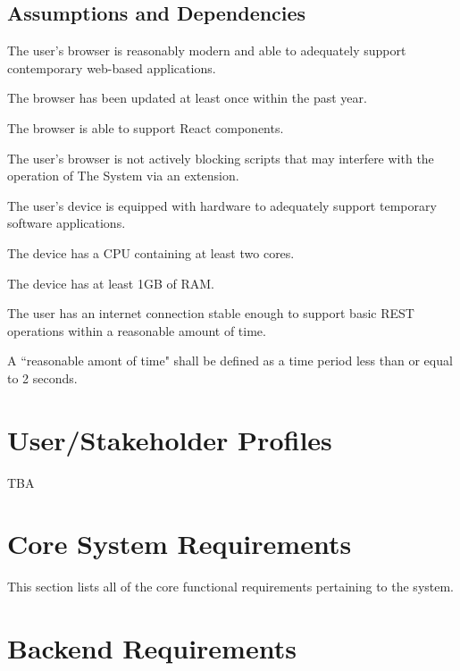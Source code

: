 \documentclass[12pt]{report}
\begin{document}
	\subsection{Assumptions and Dependencies}
		\begin{reqlist}
			\item The user's browser is reasonably modern and able to adequately support contemporary web-based applications.
			\begin{reqlist}
				\item The browser has been updated at least once within the past year.
				\item The browser is able to support React components.
			\end{reqlist}
			\item The user's browser is not actively blocking scripts that may interfere with the operation of The System via an extension.
			\item The user's device is equipped with hardware to adequately support temporary software applications.
			\begin{reqlist}
				\item The device has a CPU containing at least two cores.
				\item The device has at least 1GB of RAM.
			\end{reqlist}
			\item The user has an internet connection stable enough to support basic REST operations within a reasonable amount of time.
			\begin{reqlist}
				\item A ``reasonable amont of time" shall be defined as a time period less than or equal to 2 seconds.
			\end{reqlist}
		\end{reqlist}

\section{User/Stakeholder Profiles}
	TBA

\section{Core System Requirements}
	This section lists all of the core functional requirements pertaining to the system.

\section{Backend Requirements}
\end{document}

